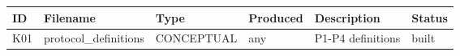\begin{tabular}{llllll}
\toprule
ID & Filename & Type & Produced & Description & Status \\
\midrule
K01 & protocol_definitions & CONCEPTUAL & any & P1-P4 definitions & built \\
\bottomrule
\end{tabular}
